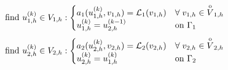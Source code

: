 \begin{equation*}
    \text{find } u^{(k)}_{1,h} \in V_{1,h} : \begin{cases}
        a_1(u^{(k)}_{1,h}, v_{1,h}) = \mathcal{L}_1 (v_{1,h}) & \forall \; v_{1,h} \in \overset{\mathrm{o}}{V}_{1,h} \\
        u^{(k)}_{1,h} = u^{(k-1)}_{2,h} & \text{on } \Gamma_1
    \end{cases}
\end{equation*}
\begin{equation*}
    \text{find } u^{(k)}_{2,h} \in V_{2,h} : \begin{cases}
        a_2(u^{(k)}_{2,h}, v_{2,h}) = \mathcal{L}_2 (v_{2,h}) & \forall \; v_{2,h} \in \overset{\mathrm{o}}{V}_{2,h} \\
        u^{(k)}_{2,h} = u^{(k)}_{1,h} & \text{on } \Gamma_2
    \end{cases}
\end{equation*}